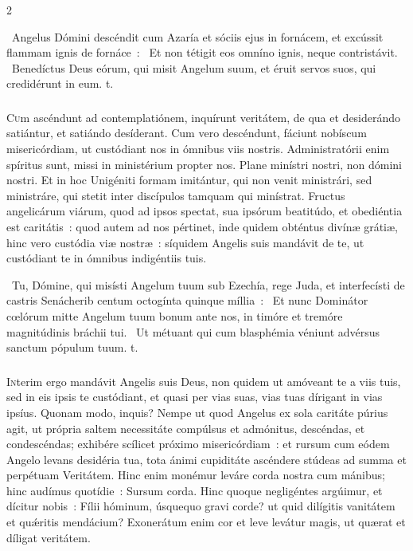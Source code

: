 \documentclass[9pt,twoside]{extarticle}
\begin{document}
\begin{multicols}{2}
{\begin{tightlist}{}
\item {}~Angelus Dómini descéndit cum Azaría et sóciis ejus in fornácem, et excússit flammam ignis de fornáce~: \textred{*}~Et non tétigit eos omníno ignis, neque contristávit. ~Benedíctus Deus eórum, qui misit Angelum suum, et éruit servos suos, qui credidérunt in eum. t.
\end{tightlist}

\subsubsection*{\center {}}
\lettrine{C}um ascéndunt ad contemplatiónem, inquírunt veritátem, de qua et desiderándo satiántur, et satiándo desíderant. Cum vero descéndunt, fáciunt nobíscum misericórdiam, ut custódiant nos in ómnibus viis nostris. Administratórii enim spíritus sunt, missi in ministérium propter nos. Plane minístri nostri, non dómini nostri. Et in hoc Unigéniti formam imitántur, qui non venit ministrári, sed ministráre, qui stetit inter discípulos tamquam qui minístrat. Fructus angelicárum viárum, quod ad ipsos spectat, sua ipsórum beatitúdo, et obediéntia est caritátis~: quod autem ad nos pértinet, inde quidem obténtus divínæ grátiæ, hinc vero custódia viæ nostræ~: síquidem Angelis suis mandávit de te, ut custódiant te in ómnibus indigéntiis tuis.

\begin{tightlist}{}
\item {}~Tu, Dómine, qui misísti Angelum tuum sub Ezechía, rege Juda, et interfecísti de castris Senácherib centum octogínta quinque míllia~: \textred{*}~Et nunc Dominátor cœlórum mitte Angelum tuum bonum ante nos, in timóre et tremóre magnitúdinis bráchii tui. ~Ut métuant qui cum blasphémia véniunt advérsus sanctum pópulum tuum. t.
\end{tightlist}

\subsubsection*{\center {}}
\lettrine{I}nterim ergo mandávit Angelis suis Deus, non quidem ut amóveant te a viis tuis, sed in eis ipsis te custódiant, et quasi per vias suas, vias tuas dírigant in vias ipsíus. Quonam modo, inquis? Nempe ut quod Angelus ex sola caritáte púrius agit, ut própria saltem necessitáte compúlsus et admónitus, descéndas, et condescéndas; exhibére scílicet próximo misericórdiam~: et rursum cum eódem Angelo levans desidéria tua, tota ánimi cupiditáte ascéndere stúdeas ad summa et perpétuam Veritátem. Hinc enim monémur leváre corda nostra cum mánibus; hinc audímus quotídie~: Sursum corda. Hinc quoque negligéntes argúimur, et dícitur nobis~: Fílii hóminum, úsquequo gravi corde? ut quid dilígitis vanitátem et quǽritis mendácium? Exonerátum enim cor et leve levátur magis, ut quærat et díligat veritátem.

}
\end{multicols}
\end{document}
